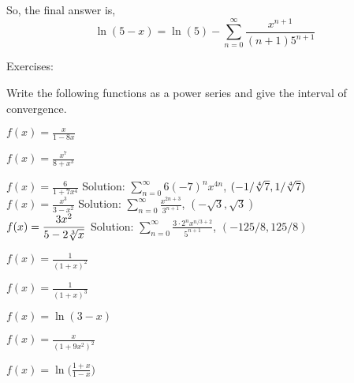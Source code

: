 \documentclass[10pt]{article}
\newcommand{\ds}{\displaystyle}
\begin{document}
So, the final answer is, 
$$\ln(5-x) =\ln(5) - \sum\limits_{n=0}^{\infty} \frac{x^{n+1}}{(n+1)5^{n+1}}$$




Exercises:

Write the following functions as a power series and give the interval of convergence.

$\ds f(x)=\frac{x}{1-8x}$

$\ds f(x)=\frac{x^7}{8+x^3}$

$\ds f(x)=\frac{6}{1+7x^4}$  		Solution: $\ds \sum_{n=0}^\infty 6(-7)^nx^{4n}$,  $(-1/\root 4 \of 7 ,1/\root 4 \of 7)$\\


$\ds f(x)=\frac{x^3}{3-x^2}$		Solution: $\ds \sum_{n=0}^\infty \frac{x^{2n+3}}{3^{n+1}}$, $(-\sqrt3,\sqrt3)$\\

$\ds f(x)=\frac{3x^2}{5-2\root 3 \of x}$		Solution: $\ds \sum_{n=0}^\infty \frac{3\cdot2^n x^{n/3+2}}{5^{n+1}}$, $(-125/8,125/8)$

$ \ds f(x)=\frac{1}{(1+x)^2}$

$ \ds f(x)=\frac{1}{(1+x)^3}$

$\ds f(x)=\ln(3-x)$

$\ds f(x)=\frac {x}{(1+9x^2)^2}$

$\ds f(x)=\ln\biggl(\frac{1+x}{1-x}\biggr)$
\end{document}
